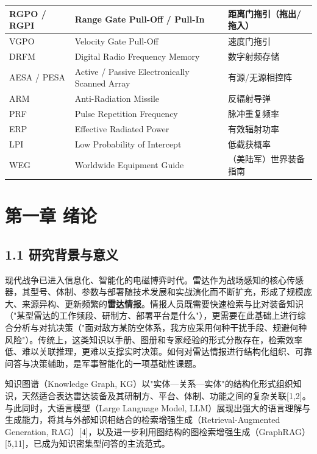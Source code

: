 \documentclass[12pt,a4paper]{ctexart}
\begin{document}
\begin{center}
\begin{tabular}{|p{}|p{}|p{}|}
RGPO / RGPI & Range Gate Pull-Off / Pull-In & 距离门拖引（拖出/拖入） \\ \hline
VGPO & Velocity Gate Pull-Off & 速度门拖引 \\ \hline
DRFM & Digital Radio Frequency Memory & 数字射频存储 \\ \hline
AESA / PESA & Active / Passive Electronically Scanned Array & 有源/无源相控阵 \\ \hline
ARM & Anti-Radiation Missile & 反辐射导弹 \\ \hline
PRF & Pulse Repetition Frequency & 脉冲重复频率 \\ \hline
ERP & Effective Radiated Power & 有效辐射功率 \\ \hline
LPI & Low Probability of Intercept & 低截获概率 \\ \hline
WEG & Worldwide Equipment Guide & （美陆军）世界装备指南 \\ \hline
\end{tabular}
\end{center}



\section*{第一章 绪论}

\subsection*{1.1 研究背景与意义}

现代战争已进入信息化、智能化的电磁博弈时代。雷达作为战场感知的核心传感器，其型号、体制、参数与部署随技术发展和实战演化而不断扩充，形成了规模庞大、来源异构、更新频繁的\textbf{雷达情报}。情报人员既需要快速检索与比对装备知识（"某型雷达的工作频段、研制方、部署平台是什么"），更需要在此基础上进行综合分析与对抗决策（"面对敌方某防空体系，我方应采用何种干扰手段、规避何种风险"）。传统上，这类知识以手册、图册和专家经验的形式分散存在，检索效率低、难以关联推理，更难以支撑实时决策。如何对雷达情报进行结构化组织、可靠问答与决策辅助，是军事智能化的一项基础性课题。

知识图谱（Knowledge Graph, KG）以"实体—关系—实体"的结构化形式组织知识，天然适合表达雷达装备及其研制方、平台、体制、功能之间的复杂关联[1,2]。与此同时，大语言模型（Large Language Model, LLM）展现出强大的语言理解与生成能力，将其与外部知识相结合的检索增强生成（Retrieval-Augmented Generation, RAG）[4]，以及进一步利用图结构的图检索增强生成（GraphRAG）[5,11]，已成为知识密集型问答的主流范式。
\end{document}
